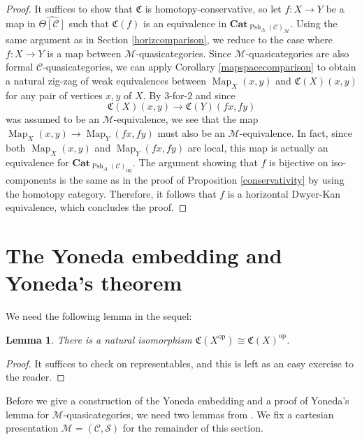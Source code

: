 \documentclass{amsart}
\numberwithin{equation}{section}
\theoremstyle{plain}   %
\newtheorem{lemma}[subsection]{Lemma}
\theoremstyle{remark}
\theoremstyle{plain}
\DeclareMathOperator{\Psh}{Psh}
\newcommand{\op}{\ensuremath{\mathrm{op}}}
\newcommand{\Cat}{\ensuremath{\mathbf{Cat}}}
\DeclareMathOperator{\Map}{Map}
\newcommand{\C}{\ensuremath{\mathcal{C}}}
\newcommand{\M}{\ensuremath{\mathcal{M}}}
\newcommand{\setS}{\ensuremath{\mathscr{S}}}
\newcommand{\cellset}{\ensuremath{\widehat{\Theta[\mathcal{C}]}}}
\begin{document}
\begin{proof} It suffices to show that \(\mathfrak{C}\) is homotopy-conservative, so let \(f:X\to Y\) be a map in \(\cellset\) such that \(\mathfrak{C}(f)\) is an equivalence in \(\Cat_{\Psh_\Delta(\C)_{\M}}\). Using the same argument as in Section \ref{horizcomparison}, we reduce to the case where \(f:X\to Y\) is a map between \(\M\)-quasicategories.  Since \(\M\)-quasicategories are also formal \(\C\)-quasicategories, we can apply Corollary \ref{mapspacecomparison} to obtain a natural zig-zag of weak equivalences between \(\Map_X(x,y)\) and \(\mathfrak{C}(X)(x,y)\) for any pair of vertices \(x,y\) of \(X\).  By \(3\)-for-\(2\) and since \[\mathfrak{C}(X)(x,y) \to \mathfrak{C}(Y)(fx,fy)\] was assumed to be an \(\M\)-equivalence, we see that the map \(\Map_X(x,y)\to \Map_Y(fx,fy)\) must also be an \(\M\)-equivalence.  In fact, since both \(\Map_X(x,y)\) and \(\Map_Y(fx,fy)\) are local, this map is actually an equivalence for \(\Cat_{\Psh_\Delta(\C)_{\mathrm{inj}}}\).  The argument showing that \(f\) is bijective on iso-components is the same as in the proof of Proposition \ref{conservativity} by using the homotopy category.  Therefore, it follows that \(f\) is a horizontal Dwyer-Kan equivalence, which concludes the proof.
\end{proof}
\section{The Yoneda embedding and Yoneda's theorem}
We need the following lemma in the sequel:
\begin{lemma} There is a natural isomorphism \(\mathfrak{C}(X^\op)\cong \mathfrak{C}(X)^\op\).  
\end{lemma} 
\begin{proof}
	It suffices to check on representables, and this is left as an easy exercise to the reader.
\end{proof}
Before we give a construction of the Yoneda embedding and a proof of Yoneda's lemma for \(\M\)-quasicategories, we need two lemmas from \cite{htt}.   We fix a cartesian presentation \(\mathcal{M}=(\C,\setS)\) for the remainder of this section.
\end{document}
